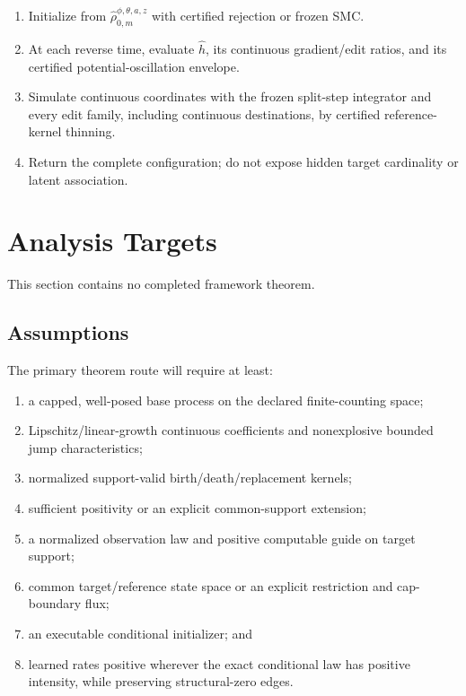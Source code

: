 \documentclass[11pt]{article}
\begin{document}
\begin{enumerate}
\item Initialize from \(\widehat\rho_{0,m}^{\phi,\theta,a,z}\) with certified rejection or frozen SMC.
\item At each reverse time, evaluate \(\widehat h\), its continuous gradient/\allowbreak{}edit ratios, and its certified potential-oscillation envelope.
\item Simulate continuous coordinates with the frozen split-step integrator and every edit family, including continuous destinations, by certified reference-kernel thinning.
\item Return the complete configuration; do not expose hidden target cardinality or latent association.
\end{enumerate}

\section{Analysis Targets}
\label{sec:analysis-targets}

This section contains no completed framework theorem.

\subsection{Assumptions}
\label{sec:assumptions}

The primary theorem route will require at least:

\begin{enumerate}
\item a capped, well-posed base process on the declared finite-counting space;
\item Lipschitz/\allowbreak{}linear-growth continuous coefficients and nonexplosive bounded jump characteristics;
\item normalized support-valid birth/\allowbreak{}death/\allowbreak{}replacement kernels;
\item sufficient positivity or an explicit common-support extension;
\item a normalized observation law and positive computable guide on target support;
\item common target/\allowbreak{}reference state space or an explicit restriction and cap-boundary flux;
\item an executable conditional initializer; and
\item learned rates positive wherever the exact conditional law has positive intensity, while preserving structural-zero edges.
\end{enumerate}
\end{document}
